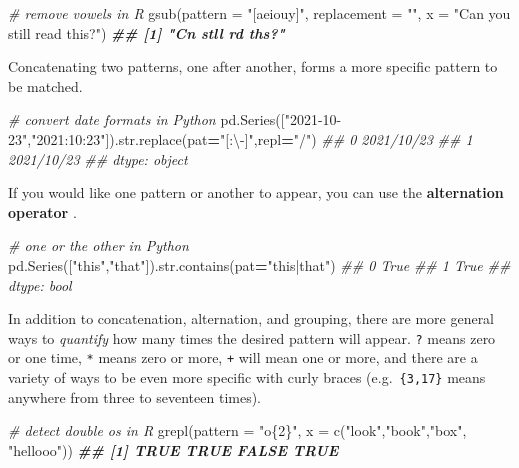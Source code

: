 \documentclass[
  12pt,
  krantz2]{krantz}
\makeatletter
\newenvironment{Shaded}{\begin{snugshade}}{\end{snugshade}}
\newcommand{\AttributeTok}[1]{\textcolor[rgb]{0.61,0.61,0.61}{#1}}
\newcommand{\BuiltInTok}[1]{#1}
\newcommand{\CommentTok}[1]{\textcolor[rgb]{0.37,0.37,0.37}{\textit{#1}}}
\newcommand{\DocumentationTok}[1]{\textcolor[rgb]{0.37,0.37,0.37}{\textbf{\textit{#1}}}}
\newcommand{\FunctionTok}[1]{\textcolor[rgb]{0,0,0}{#1}}
\newcommand{\NormalTok}[1]{#1}
\newcommand{\OperatorTok}[1]{\textcolor[rgb]{0.43,0.43,0.43}{\textbf{#1}}}
\newcommand{\StringTok}[1]{\textcolor[rgb]{0.5,0.5,0.5}{#1}}
\newenvironment{kframe}{%
\medskip{}
\setlength{\fboxsep}{.8em}
 \def\at@end@of@kframe{}%
 \ifinner\ifhmode%
  \def\at@end@of@kframe{\end{minipage}}%
  \begin{minipage}{\columnwidth}%
 \fi\fi%
 \def\FrameCommand##1{\hskip\@totalleftmargin \hskip-\fboxsep
 \colorbox{shadecolor}{##1}\hskip-\fboxsep
     \hskip-\linewidth \hskip-\@totalleftmargin \hskip\columnwidth}%
 \MakeFramed {\advance\hsize-\width
   \@totalleftmargin\z@ \linewidth\hsize
   \@setminipage}}%
 {\par\unskip\endMakeFramed%
 \at@end@of@kframe}
\renewenvironment{Shaded}{\begin{kframe}}{\end{kframe}}
\makeatother
\begin{document}
\begin{Shaded}
\begin{Highlighting}[]
\CommentTok{\# remove vowels in R}
\FunctionTok{gsub}\NormalTok{(}\AttributeTok{pattern =} \StringTok{"[aeiouy]"}\NormalTok{, }\AttributeTok{replacement =} \StringTok{""}\NormalTok{, }\AttributeTok{x =} \StringTok{"Can you still read this?"}\NormalTok{)}
\DocumentationTok{\#\# [1] "Cn  stll rd ths?"}
\end{Highlighting}
\end{Shaded}

Concatenating two patterns, one after another, forms a more specific pattern to be matched.

\begin{Shaded}
\begin{Highlighting}[]
\CommentTok{\# convert date formats in Python}
\NormalTok{pd.Series([}\StringTok{"2021{-}10{-}23"}\NormalTok{,}\StringTok{"2021:10:23"}\NormalTok{]).}\BuiltInTok{str}\NormalTok{.replace(pat}\OperatorTok{=}\StringTok{"[:\textbackslash{}{-}]"}\NormalTok{,repl}\OperatorTok{=}\StringTok{"/"}\NormalTok{)}
\CommentTok{\#\# 0    2021/10/23}
\CommentTok{\#\# 1    2021/10/23}
\CommentTok{\#\# dtype: object}
\end{Highlighting}
\end{Shaded}

If you would like one pattern or another to appear, you can use the \textbf{alternation operator} \texttt{\textbar{}}.

\begin{Shaded}
\begin{Highlighting}[]
\CommentTok{\# one or the other in Python}
\NormalTok{pd.Series([}\StringTok{"this"}\NormalTok{,}\StringTok{"that"}\NormalTok{]).}\BuiltInTok{str}\NormalTok{.contains(pat}\OperatorTok{=}\StringTok{"this|that"}\NormalTok{)}
\CommentTok{\#\# 0    True}
\CommentTok{\#\# 1    True}
\CommentTok{\#\# dtype: bool}
\end{Highlighting}
\end{Shaded}

In addition to concatenation, alternation, and grouping, there are more general ways to \emph{quantify} how many times the desired pattern will appear. \texttt{?} means zero or one time, \texttt{*} means zero or more, \texttt{+} will mean one or more, and there are a variety of ways to be even more specific with curly braces (e.g.~\texttt{\{3,17\}} means anywhere from three to seventeen times).

\begin{Shaded}
\begin{Highlighting}[]
\CommentTok{\# detect double o\textquotesingle{}s in R}
\FunctionTok{grepl}\NormalTok{(}\AttributeTok{pattern =} \StringTok{"o\{2\}"}\NormalTok{, }\AttributeTok{x =} \FunctionTok{c}\NormalTok{(}\StringTok{"look"}\NormalTok{,}\StringTok{"book"}\NormalTok{,}\StringTok{"box"}\NormalTok{, }\StringTok{"hellooo"}\NormalTok{))}
\DocumentationTok{\#\# [1]  TRUE  TRUE FALSE  TRUE}
\end{Highlighting}
\end{Shaded}
\end{document}
